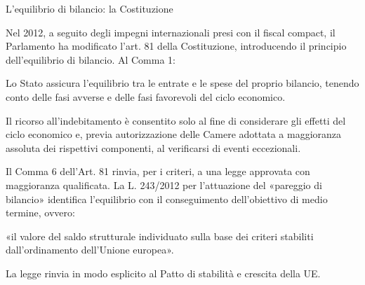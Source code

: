 \documentclass[aspectratio=64,11pt]{beamer}
\begin{document}
\begin{frame}{L'equilibrio di bilancio: la Costituzione}
  
  Nel 2012, a seguito degli impegni internazionali presi con il \alert{fiscal
    compact}, il Parlamento ha modificato l'art. 81 della Costituzione,
  introducendo il principio dell'\alert{equilibrio di bilancio}. Al Comma 1:

  \begin{quoting}
    \footnotesize Lo Stato assicura l’equilibrio tra le entrate e le spese del
    proprio bilancio, tenendo conto delle fasi avverse e delle fasi favorevoli
    del ciclo economico.

    Il ricorso all’indebitamento è consentito solo al fine di considerare gli
    effetti del ciclo economico e, previa autorizzazione delle Camere adottata
    a maggioranza assoluta dei rispettivi componenti, al verificarsi di eventi
    eccezionali.
  \end{quoting}

  Il Comma 6 dell'Art. 81 rinvia, per i criteri, a una legge approvata con
  maggioranza qualificata. La L. 243/2012 per l'attuazione del «pareggio di
  bilancio» identifica l'equilibrio con il conseguimento dell'\alert{obiettivo
    di medio termine}, ovvero:

  \begin{quoting}
    \small «il valore del \alert{saldo strutturale} individuato sulla base dei
    criteri stabiliti dall'ordinamento dell'Unione europea».
  \end{quoting}

  La legge rinvia in modo esplicito al \alert{Patto di stabilità e crescita}
  della UE.
\end{frame}
\end{document}
